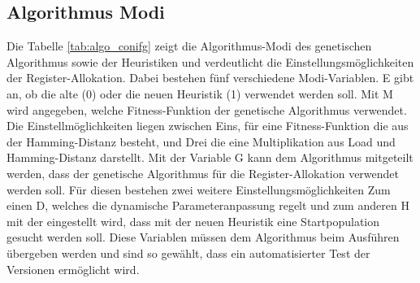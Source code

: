 \newpage
\subsection{Algorithmus Modi}
Die Tabelle \ref{tab:algo_conifg} zeigt die Algorithmus-Modi des genetischen Algorithmus sowie der Heuristiken und verdeutlicht die Einstellungsmöglichkeiten der Register-Allokation. Dabei bestehen fünf verschiedene Modi-Variablen. E gibt an, ob die alte (0) oder die neuen Heuristik (1) verwendet werden soll. Mit M wird angegeben, welche Fitness-Funktion der genetische Algorithmus verwendet. Die Einstellmöglichkeiten liegen zwischen Eins, für eine Fitness-Funktion die aus der Hamming-Distanz besteht, und Drei die eine Multiplikation aus Load und Hamming-Distanz darstellt. Mit der Variable G  kann dem Algorithmus mitgeteilt werden, dass der genetische Algorithmus für die Register-Allokation verwendet werden soll. Für diesen bestehen zwei weitere Einstellungsmöglichkeiten Zum einen D, welches die dynamische Parameteranpassung regelt und zum anderen H mit der eingestellt wird, dass mit der neuen Heuristik eine Startpopulation gesucht werden soll. Diese Variablen müssen dem Algorithmus beim Ausführen übergeben werden und sind so gewählt, dass ein automatisierter Test der Versionen ermöglicht wird.

